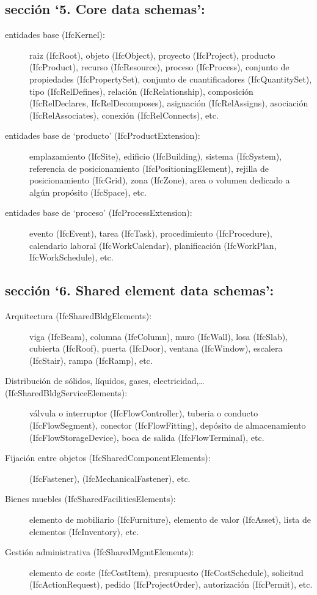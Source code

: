 \documentclass[spanish,12pt,a4paper,final,oneside]{book}
\begin{document}
\subsection{sección `5. Core data schemas':}

\begin{description}
\item[entidades base (IfcKernel):] raiz (IfcRoot), objeto (IfcObject), proyecto (IfcProject), producto (IfcProduct), recurso (IfcResource), proceso (IfcProcess), conjunto de propiedades (IfcPropertySet), conjunto de cuantificadores (IfcQuantitySet), tipo (IfcRelDefines), relación (IfcRelationship), composición (IfcRelDeclares, IfcRelDecomposes), asignación (IfcRelAssigns), asociación (IfcRelAssociates), conexión (IfcRelConnects), etc.

\item[entidades base de `producto' (IfcProductExtension):] emplazamiento (IfcSite), edificio (IfcBuilding), sistema (IfcSystem), referencia de posicionamiento (IfcPositioningElement), rejilla de posicionamiento (IfcGrid), zona (IfcZone), area o volumen dedicado a algún propósito (IfcSpace), etc.
  
\item[entidades base de `proceso' (IfcProcessExtension):] evento (IfcEvent), tarea (IfcTask), procedimiento (IfcProcedure), calendario laboral (IfcWorkCalendar), planificación (IfcWorkPlan, IfcWorkSchedule), etc. 
\end{description}

\subsection{sección `6. Shared element data schemas':} 

\begin{description}
\item[Arquitectura (IfcSharedBldgElements):] viga (IfcBeam), columna (IfcColumn), muro (IfcWall), losa (IfcSlab), cubierta (IfcRoof), puerta (IfcDoor), ventana (IfcWindow), escalera (IfcStair), rampa (IfcRamp), etc.

\item[Distribución de sólidos, líquidos, gases, electricidad,\ldots (IfcSharedBldgServiceElements):] válvula o interruptor (IfcFlowController), tuberia o conducto (IfcFlowSegment), conector (IfcFlowFitting), depósito de almacenamiento (IfcFlowStorageDevice), boca de salida (IfcFlowTerminal), etc.

\item[Fijación entre objetos (IfcSharedComponentElements):] (IfcFastener), (IfcMechanicalFastener), etc.

\item[Bienes muebles (IfcSharedFacilitiesElements):] elemento de mobiliario (IfcFurniture), elemento de valor (IfcAsset), lista de elementos (IfcInventory), etc.

\item[Gestión administrativa (IfcSharedMgmtElements):] elemento de coste (IfcCostItem), presupuesto (IfcCostSchedule), solicitud (IfcActionRequest), pedido (IfcProjectOrder), autorización (IfcPermit), etc. 
\end{description}
\end{document}
